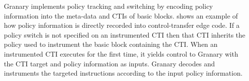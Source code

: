 \documentclass[preprint]{sigplanconf}
\newcommand{\toolname}[1]{{\scshape #1}}
\begin{document}



Granary implements policy tracking and switching by encoding policy information into the meta-data and CTIs of basic blocks.  shows an example of how policy information is directly recorded into control-transfer edge code. If a policy switch is not specified on an instrumented CTI then that CTI inherits the policy used to instrument the basic block containing the CTI. When an instrumented CTI executes for the first time, it yields control to Granary with the CTI target and policy information as inputs. Granary decodes and instruments the targeted instructions according to the input policy information.
\end{document}
